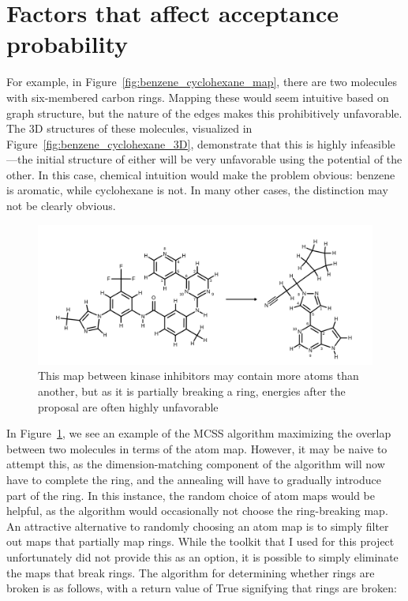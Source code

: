 \section{Factors that affect acceptance probability}
%
For example, in Figure~\ref{fig:benzene_cyclohexane_map}, there are two molecules with six-membered carbon rings.
%
Mapping these would seem intuitive based on graph structure, but the nature of the edges makes this prohibitively unfavorable.
%
The 3D structures of these molecules, visualized in Figure~\ref{fig:benzene_cyclohexane_3D}, demonstrate that this is highly infeasible---the initial structure of either will be very unfavorable using the potential of the other.
%
In this case, chemical intuition would make the problem obvious: benzene is aromatic, while cyclohexane is not.
%
In many other cases, the distinction may not be clearly obvious.
%
\begin{figure}[h]
    \centering
    \includegraphics[width=1.0\textwidth]{kinase_map_bad.png}
    \caption{This map between kinase inhibitors may contain more atoms than another, but as it is partially breaking a ring, energies after the proposal are often highly unfavorable}
    \label{fig:bad_kinase_map}
\end{figure}
%
In Figure~\ref{fig:bad_kinase_map}, we see an example of the MCSS algorithm maximizing the overlap between two molecules in terms of the atom map.
%
However, it may be naive to attempt this, as the dimension-matching component of the algorithm will now have to complete the ring, and the annealing will have to gradually introduce part of the ring.
%
In this instance, the random choice of atom maps would be helpful, as the algorithm would occasionally not choose the ring-breaking map.
%
An attractive alternative to randomly choosing an atom map is to simply filter out maps that partially map rings.
%
While the toolkit that I used for this project unfortunately did not provide this as an option, it is possible to simply eliminate the maps that break rings.
%
The algorithm for determining whether rings are broken is as follows, with a return value of True signifying that rings are broken:

